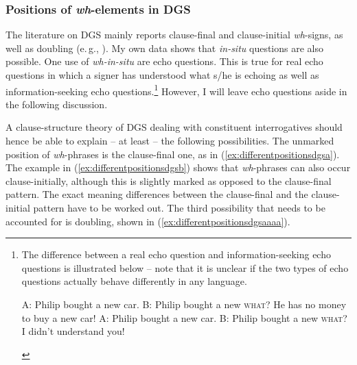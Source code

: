 \subsubsection{Positions of \textit{wh}-elements in DGS}

The literature on DGS mainly reports clause-final and clause-initial \textit{wh}-signs, as well as doubling (e.\,g., \citealt{papaspyrou2008grammatik, happ2014vork}). My own data shows that \textit{in-situ} questions are also possible. One use of \textit{wh-in-situ} are echo questions. This is true for real echo questions in which a signer has understood what s/he is echoing as well as information-seeking echo questions.\footnote{ The difference between a real echo question and information-seeking echo questions is illustrated below -- note that it is unclear if the two types of echo questions actually behave differently in any language.

\begin{exe}
\ex\label{echoquestionillustrationenglish}\begin{xlist}
\ex A: Philip bought a new car.
\glt B: Philip bought a new \textsc{what}? He has no money to buy a new car! \label{echoquestionillustrationenglishb}
\ex A: Philip bought a new car.
\glt B: Philip bought a new \textsc{what}? I didn't understand you! \label{echoquestionillustrationenglisha}

\end{xlist}
\end{exe}

} However, I will leave echo questions aside in the following discussion.

A clause-structure theory of DGS dealing with constituent interrogatives should hence be able to explain -- at least -- the following possibilities. The unmarked position of \textit{wh}-phrases is the clause-final one, as in (\ref{ex:differentpositionsdgsa}). The example in (\ref{ex:differentpositionsdgsb}) shows that \textit{wh}-phrases can also occur clause-initially, although this is slightly marked as opposed to the clause-final pattern. The exact meaning differences between the clause-final and the clause-initial pattern have to be worked out. The third possibility that needs to be accounted for is doubling, shown in (\ref{ex:differentpositionsdgsaaaa}). 

